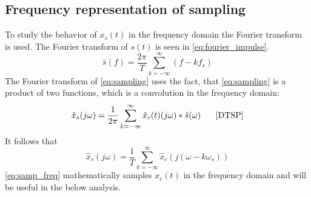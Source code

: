 \subsection{Frequency representation of sampling}
To study the behavior of $x_s(t)$ in the frequency domain the Fourier transform is used. The Fourier transform of $s(t)$ is seen in \eqref{eq:fourier_impulse}.
\begin{equation}\label{eq:fourier_impulse}
\hat{s}(f)=\frac{2\pi}{T}\sum_{k=-\infty}^{\infty}(f-kf_s)
\end{equation}
The Fourier transform of \eqref{eq:sampling} uses the fact, that \eqref{eq:sampling} is a product of two functions, which is a convolution in the frequency domain:
\begin{equation}
\hat{x}_s(j\omega)=\frac{1}{2\pi}\sum_{k=-\infty}^{\infty}\hat{x}_c(t)(j\omega)*\hat{s}(\omega)\phantom{mm}\text{\cite{DTSP}}
\end{equation}
It follows  that
\begin{equation}\label{eq:samp_freq}
\hat{x}_s(j\omega)=\frac{1}{T}\sum_{k=-\infty}^{\infty}\hat{x}_c(j(\omega-k\omega_s))
\end{equation}
\eqref{eq:samp_freq} mathematically samples $x_c(t)$ in the frequency domain and will be useful in the below analysis.
